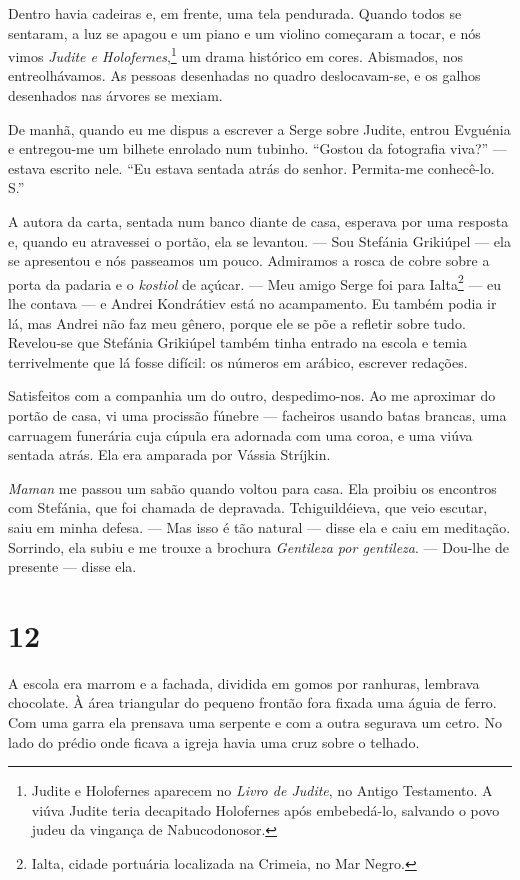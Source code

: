 Dentro havia cadeiras e, em frente, uma tela pendurada. Quando todos se
sentaram, a luz se apagou e um piano e um violino começaram a tocar, e
nós vimos \emph{Judite e Holofernes},\footnote{Judite e Holofernes
  aparecem no \emph{Livro de Judite}, no Antigo Testamento. A viúva
  Judite teria decapitado Holofernes após embebedá-lo, salvando o povo
  judeu da vingança de Nabucodonosor.} um drama histórico em cores.
Abismados, nos entreolhávamos. As pessoas desenhadas no quadro
deslocavam-se, e os galhos desenhados nas árvores se mexiam.

De manhã, quando eu me dispus a escrever a Serge sobre Judite, entrou
Evguénia e entregou-me um bilhete enrolado num tubinho. ``Gostou da
fotografia viva?'' --- estava escrito nele. ``Eu estava sentada atrás do
senhor. Permita-me conhecê-lo. S.''

A autora da carta, sentada num banco diante de casa, esperava por uma
resposta e, quando eu atravessei o portão, ela se levantou. --- Sou
Stefánia Grikiúpel --- ela se apresentou e nós passeamos um pouco.
Admiramos a rosca de cobre sobre a porta da padaria e o \emph{kostiol}
de açúcar. --- Meu amigo Serge foi para Ialta\footnote{Ialta, cidade
  portuária localizada na Crimeia, no Mar Negro.} --- eu lhe contava ---
e Andrei Kondrátiev está no acampamento. Eu também podia ir lá, mas
Andrei não faz meu gênero, porque ele se põe a refletir sobre tudo.
Revelou-se que Stefánia Grikiúpel também tinha entrado na escola e temia
terrivelmente que lá fosse difícil: os números em arábico, escrever
redações.

Satisfeitos com a companhia um do outro, despedimo-nos. Ao me aproximar
do portão de casa, vi uma procissão fúnebre --- facheiros usando batas
brancas, uma carruagem funerária cuja cúpula era adornada com uma coroa,
e uma viúva sentada atrás. Ela era amparada por Vássia Stríjkin.

\emph{Maman} me passou um sabão quando voltou para casa. Ela proibiu os
encontros com Stefánia, que foi chamada de depravada. Tchiguildéieva,
que veio escutar, saiu em minha defesa. --- Mas isso é tão natural ---
disse ela e caiu em meditação. Sorrindo, ela subiu e me trouxe a
brochura \emph{Gentileza por gentileza}. --- Dou-lhe de presente ---
disse ela.

\section{12}

A escola era marrom e a fachada, dividida em gomos por ranhuras,
lembrava chocolate. À área triangular do pequeno frontão fora fixada uma
águia de ferro. Com uma garra ela prensava uma serpente e com a outra
segurava um cetro. No lado do prédio onde ficava a igreja havia uma cruz
sobre o telhado.

